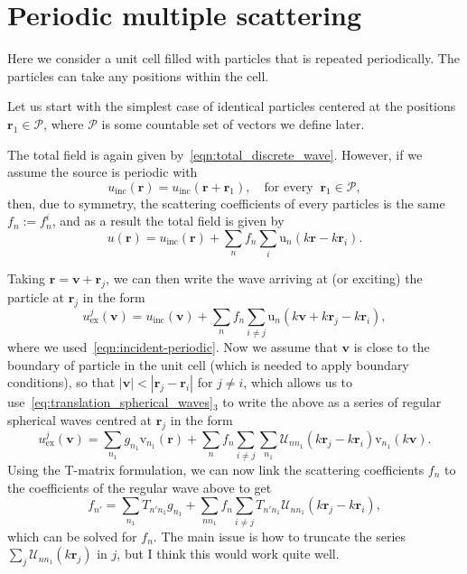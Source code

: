 \documentclass[ 12pt, a4paper]{article}
\renewcommand{\vec}[1]{\boldsymbol{#1}}
\begin{document}
\section{Periodic multiple scattering}

Here we consider a unit cell filled with particles that is repeated periodically. The particles can take any positions within the cell.

Let us start with the simplest case of identical particles centered at the positions $\vec r_1 \in \mathcal P$, where $\mathcal P$ is some countable set of vectors we define later.

The total field is again given by~\eqref{eqn:total_discrete_wave}. However, if we assume the source is periodic with
\begin{equation}\label{eqn:incident-periodic}
  u_\mathrm{inc}(\vec r) = u_\mathrm{inc}(\vec r + \vec r_1), \quad \text{for every} \;\; \vec r_1 \in \mathcal P,
\end{equation}
then, due to symmetry, the scattering coefficients of every particles is the same $f_n := f^i_n$, and as a result the total field is given by
\[
u(\vec r) = u_\mathrm{inc}(\vec r) + \sum_n f_n \sum_{i} \mathrm u_n(k \vec r - k \vec r_i).
\]

Taking $\vec r = \vec v + \vec r_j$, we can then write the wave arriving at (or exciting) the particle at $\vec r_j$ in the form
\[
u^{j}_\mathrm{ex}(\vec v) = u_\mathrm{inc}(\vec v) + \sum_n f_n \sum_{i \not = j} \mathrm u_n(k \vec v + k \vec r_j - k \vec r_i),
\]
where we used~\eqref{eqn:incident-periodic}. Now we assume that $\vec v$ is close to the boundary of particle in the unit cell (which is needed to apply boundary conditions), so that $|\vec v | < |\vec r_j -  \vec r_i|$ for $j \not = i$, which allows us to use~\eqref{eq:translation_spherical_waves}${}_3$ to write the above as a series of regular spherical waves centred at $\vec r_j$ in the form
\[
u^{j}_\mathrm{ex}(\vec v) = \sum_{n_1} g_{n_1} \mathrm v_{n_1}(\vec r) + \sum_n f_n \sum_{i \not = j} \sum_{n_1} \mathcal U_{n n_1}( k \vec r_j - k \vec r_i) \mathrm v_{n_1}(k \vec v).
\]
Using the T-matrix formulation, we can now link the scattering coefficients $f_n$ to the coefficients of the regular wave above to get
\begin{equation}
  f_{n'} =  \sum_{n_1} T_{n' n_1} g_{n_1} + \sum_{n n_1} f_n \sum_{i \not = j} T_{n' n_1} \mathcal U_{n n_1}( k \vec r_j - k \vec r_i),
\end{equation}
which can be solved for $f_n$. The main issue is how to truncate the series $ \sum_j \mathcal U_{n n_1}( k \vec r_j)$ in $j$, but I think this would work quite well.

\printbibliography
\end{document}
